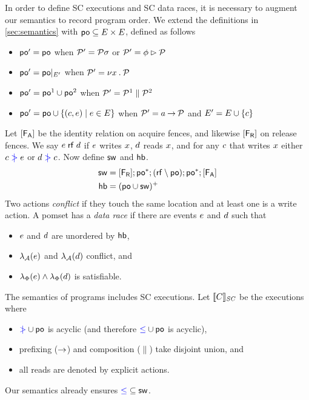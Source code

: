 In order to define SC executions and SC data races, it is necessary to
augment our semantics to record program order.  We extend the definitions in
\textsection\ref{sec:semantics} with
${\mathrel{\mathsf{po}}}\subseteq{E}\times{E}$, defined as follows
\begin{itemize}
\item
  ${\mathrel{\mathsf{po}}'} = {\mathrel{\mathsf{po}}}$
  when $\mathcal{P}'=\mathcal{P}\sigma$
  or $\mathcal{P}'=\phi\mathbin\rhd\mathcal{P}$
\item
  ${\mathrel{\mathsf{po}}'} = {\mathrel{\mathsf{po}}}\mathbin{|}_{E'}$
  when $\mathcal{P}'=\nu x\mathbin.\mathcal{P}$
\item
  ${\mathrel{\mathsf{po}}'} = {\mathrel{\mathsf{po}}}^1\cup{\ensuremath{\mathrel{\mathsf{po}}}}^2$
  when $\mathcal{P}'=\mathcal{P}^1\parallel\mathcal{P}^2$
\item
  ${\mathrel{\mathsf{po}}'} = {\mathrel{\mathsf{po}}}\cup\{(c,e)\mid e\in E\}$
  when $\mathcal{P}'=a\mathbin\rightarrow\mathcal{P}$ and $E' = E \cup \{c\}$
\end{itemize}
Let $[\mathsf{F_A}]$ be the identity relation on acquire fences, and likewise $[\mathsf{F_R}]$ on release fences.
We say $e\mathrel{\mathsf{rf}}d$ if $e$ writes $x$, $d$ reads $x$, and for any $c$ that writes $x$ either $c\mathrel{{\color{blue}\mkern4mu\mid\!\!\!>}}e$ or $d\mathrel{{\color{blue}\mkern4mu\mid\!\!\!>}}c$.
Now define $\mathrel{\mathsf{sw}}$ and $\mathrel{\mathsf{hb}}$.
\begin{align*}
  {\ensuremath{\mathrel{\mathsf{sw}}}} &= [\mathsf{F_R}]; {\mathrel{\mathsf{po}}}^*; ({\mathrel{\mathsf{rf}}}\setminus{\ensuremath{\mathrel{\mathsf{po}}}}); {\mathrel{\mathsf{po}}}^*; [\mathsf{F_A}]
  \\
  {\mathrel{\mathsf{hb}}} &= ({\mathrel{\mathsf{po}}} \cup {\ensuremath{\mathrel{\mathsf{sw}}}})^+
\end{align*}
Two actions \emph{conflict} if they touch the same location and at least one
is a write action.  A pomset has a \emph{data race} if there are events
$e$ and $d$ such that 
\begin{itemize}
\item $e$ and $d$ are unordered by $\mathrel{\mathsf{hb}}$,
\item $\lambda_{\mathcal{A}}(e)$ and $\lambda_{\mathcal{A}}(d)$ conflict, and
\item $\lambda_{\Phi}(e)\land\lambda_{\Phi}(d)$ is satisfiable.
\end{itemize}
The semantics of programs includes SC executions.  Let $\llbracket C\rrbracket_{\textit{SC}}$ be the
executions where
\begin{itemize}
\item ${\mathrel{{\color{blue}\mkern4mu\mid\!\!\!>}}}\cup{\ensuremath{\mathrel{\mathsf{po}}}}$ is acyclic (and therefore ${\mathrel{{\color{blue}\leq}}}\cup{\ensuremath{\mathrel{\mathsf{po}}}}$ is acyclic),
\item prefixing ($\mathbin\rightarrow$) and composition ($\parallel$) take disjoint union, and
\item all reads are denoted by explicit actions.
\end{itemize}
Our semantics already ensures ${\mathrel{{\color{blue}\leq}}}\subseteq{\ensuremath{\mathrel{\mathsf{sw}}}}$.

